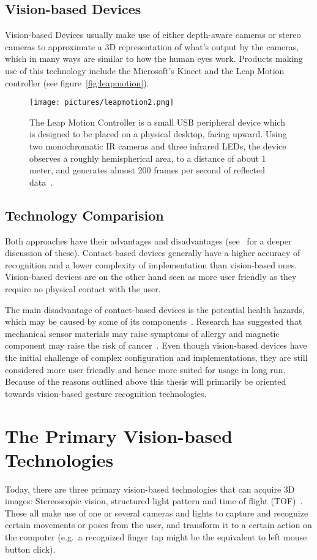\subsection{Vision-based Devices} 
Vision-based Devices usually make use of either depth-aware cameras or stereo cameras to approximate a 3D representation of what's output by the cameras, 
which in many ways are similar to how the human eyes work. 
Products making use of this technology include the Microsoft's Kinect and the Leap Motion controller (see figure~\vref{fig:leapmotion}). 

\begin{figure}%
	\texttt{[image: pictures/leapmotion2.png]}
	\caption[The Leap Motion Controller]{The Leap Motion Controller is a small USB peripheral device which is designed to be placed on a physical desktop, 
	facing upward. Using two monochromatic IR cameras and three infrared LEDs, the device observes a roughly hemispherical area, to a distance of about 1 meter, 
	and generates almost 200 frames per second of reflected data~\citep{LeapMotion2016}.}
	\label{fig:leapmotion}
\end{figure} 

\subsection{Technology Comparision}
Both approaches have their advantages and disadvantages (see~\citet{Rautaray2015} for a deeper discussion of these). 
Contact-based devices generally have a higher accuracy of recognition and a lower complexity of implementation than vision-based ones. 
Vision-based devices are on the other hand seen as more user friendly as they require no physical contact with the user. 

The main disadvantage of contact-based devices is the potential health hazards, which may be caused by some of its components~\citep{Schultz2003}. 
Research has suggested that mechanical sensor materials may raise symptoms of allergy and magnetic component may raise the risk of cancer~\citep{Nishikawa2003}. 
Even though vision-based devices have the initial challenge of complex configuration and implementations, 
they are still considered more user friendly and hence more suited for usage in long run. Because of the reasons outlined above this thesis will primarily 
be oriented towards vision-based gesture recognition technologies. 

\section{The Primary Vision-based Technologies}
Today, there are three primary vision-based technologies that can acquire 3D images: Stereoscopic vision, structured light pattern and time of flight (TOF)~\citep{Ko2012}.
These all make use of one or several cameras and lights to capture and recognize certain movements or poses from the user, 
and transform it to a certain action on the computer (e.g.~a recognized finger tap might be the equivalent to left mouse button click). 

